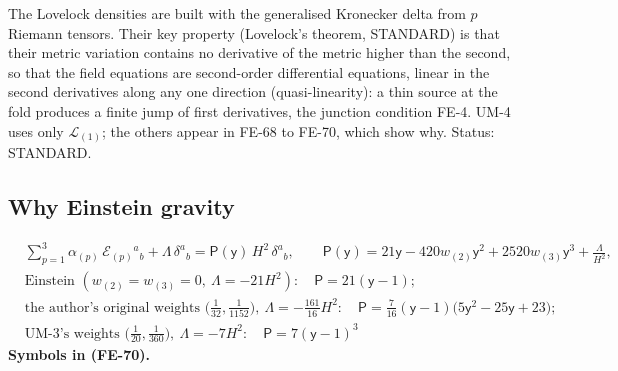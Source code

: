 \documentclass[
  10pt,
]{article}
\begin{document}
The Lovelock densities are built with the generalised Kronecker delta
from \(p\) Riemann tensors. Their key property (Lovelock's theorem,
STANDARD) is that their metric variation contains no derivative of the
metric higher than the second, so that the field equations are
second-order differential equations, linear in the second derivatives
along any one direction (quasi-linearity): a thin source at the fold
produces a finite jump of first derivatives, the junction condition
FE-4. UM-4 uses only \(\mathcal{L}_{(1)}\); the others appear in FE-68
to FE-70, which show why. Status: STANDARD.

\hypertarget{why-einstein-gravity}{%
\subsection{Why Einstein gravity}\label{why-einstein-gravity}}

\[
\begin{aligned}
&\sum_{p=1}^{3}\alpha_{(p)}\,\mathcal{E}_{(p)}{}^a{}_b + \Lambda\,\delta^a{}_b = \mathsf{P}(\mathsf{y})\,H^2\,\delta^a{}_b,\qquad
 \mathsf{P}(\mathsf{y}) = 21\mathsf{y} - 420w_{(2)}\mathsf{y}^2 + 2520w_{(3)}\mathsf{y}^3 + \frac{\Lambda}{H^2},\\
&\text{Einstein } (w_{(2)} = w_{(3)} = 0,\ \Lambda = -21H^2):\quad \mathsf{P} = 21(\mathsf{y} - 1);\\
&\text{the author's original weights } \Big(\frac{1}{32}, \frac{1}{1152}\Big),\ \Lambda = -\frac{161}{16}H^2:\quad
 \mathsf{P} = \frac{7}{16}(\mathsf{y} - 1)\big(5\mathsf{y}^2 - 25\mathsf{y} + 23\big);\\
&\text{UM-3's weights } \Big(\frac{1}{20}, \frac{1}{360}\Big),\ \Lambda = -7H^2:\quad \mathsf{P} = 7(\mathsf{y} - 1)^3
\end{aligned} \tag{FE-70}
\] \textbf{Symbols in (FE-70).}
\end{document}
